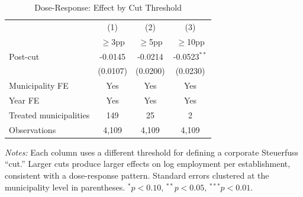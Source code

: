 \begin{table}[htbp]
\centering
\caption{Dose-Response: Effect by Cut Threshold}
\label{tab:validity}
\begin{tabular}{lccc}
\toprule
& (1) & (2) & (3) \\
& $\geq$3pp & $\geq$5pp & $\geq$10pp \\
\midrule
Post-cut & -0.0145 & -0.0214 & -0.0523$^{**}$ \\
& (0.0107) & (0.0200) & (0.0230) \\
\midrule
Municipality FE & Yes & Yes & Yes \\
Year FE & Yes & Yes & Yes \\
Treated municipalities & 149 & 25 & 2 \\
Observations & 4,109 & 4,109 & 4,109 \\
\bottomrule
\end{tabular}
\begin{tablenotes}[flushleft]
\footnotesize
\item \textit{Notes:} Each column uses a different threshold for defining a corporate Steuerfuss ``cut.'' Larger cuts produce larger effects on log employment per establishment, consistent with a dose-response pattern. Standard errors clustered at the municipality level in parentheses. $^{*}p<0.10$, $^{**}p<0.05$, $^{***}p<0.01$.
\end{tablenotes}
\end{table}
